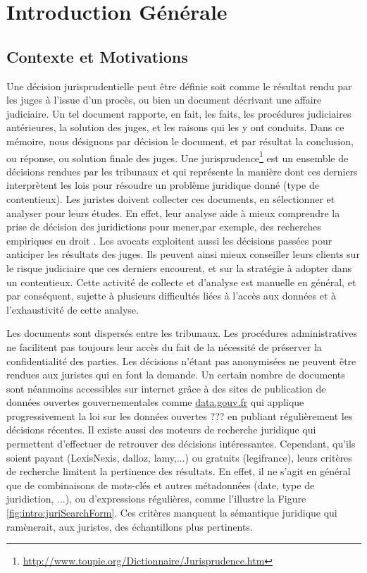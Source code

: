 \chapter*{Introduction Générale}
\label{chap:intro}

\section{Contexte et Motivations}
\label{sec:intro:contexte}
Une décision jurisprudentielle peut être définie soit comme  le résultat rendu par les juges à l'issue d'un procès, ou bien un document décrivant une affaire judiciaire. Un tel document rapporte, en fait,  les faits, les procédures judiciaires antérieures, la solution des juges, et les raisons qui les y ont conduits. Dans ce mémoire, nous désignons par \og décision \fg{} le document, et par  \og résultat\fg{} la conclusion, ou réponse, ou solution finale des juges. Une jurisprudence\footnote{\url{http://www.toupie.org/Dictionnaire/Jurisprudence.htm}} est un ensemble de décisions rendues par les tribunaux et qui représente la manière dont ces derniers interprètent les lois pour résoudre un problème juridique donné (type de contentieux). Les juristes doivent collecter ces documents, en sélectionner et analyser pour leurs études. En effet, leur analyse aide à mieux comprendre la prise de décision des juridictions pour mener,par exemple, des recherches empiriques en droit \citep{ancel2003expulsion, jeandidier2006pensions}. Les avocats exploitent aussi les décisions passées pour anticiper les résultats des juges. Ils peuvent ainsi mieux conseiller leurs clients sur le risque judiciaire que ces derniers encourent, et sur la stratégie à adopter dans un contentieux. Cette activité de collecte et d'analyse est manuelle en général, et par conséquent, sujette à plusieurs difficultés liées à l'accès aux données et à l'exhaustivité de cette analyse. 

Les documents sont dispersés entre les tribunaux. Les procédures administratives ne facilitent pas toujours leur accès du fait de la nécessité de préserver la confidentialité des parties. Les décisions n'étant pas anonymisées ne peuvent être rendues aux juristes qui en font la demande. Un certain nombre de documents sont néanmoins accessibles sur internet grâce à des sites de publication de données ouvertes gouvernementales comme \url{data.gouv.fr} qui applique progressivement la loi sur les données ouvertes ??? en publiant régulièrement les décisions récentes.  Il existe aussi des moteurs de recherche juridique qui permettent d'effectuer de retrouver des décisions intéressantes. Cependant, qu'ils soient payant (LexisNexis, dalloz, lamy,...) ou gratuits (legifrance), leurs critères de recherche limitent la pertinence des résultats. En effet, il ne s'agit en général que de combinaisons de mots-clés et autres métadonnées (date, type de juridiction, ...), ou d'expressions régulières, comme l'illustre la Figure \ref{fig:intro:juriSearchForm}. Ces critères manquent la sémantique juridique qui ramènerait, aux juristes, des échantillons plus pertinents. 

